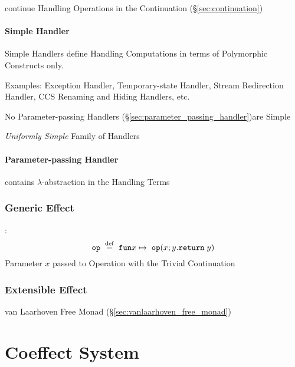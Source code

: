 continue Handling Operations in the Continuation
(\S\ref{sec:continuation})



\paragraph{Simple Handler}\label{sec:simple_handler}\hfill
\cite{plotkin-pretnar13}

Simple Handlers define Handling Computations in terms of Polymorphic
Constructs only.

Examples: Exception Handler, Temporary-state Handler, Stream
Redirection Handler, CCS Renaming and Hiding Handlers, etc.

No Parameter-passing Handlers
(\S\ref{sec:parameter_passing_handler})are Simple

\emph{Uniformly Simple} Family of Handlers



\paragraph{Parameter-passing Handler}\hfill
\label{sec:parameter_passing_handler}
\cite{plotkin-pretnar13}

contains $\lambda$-abstraction in the Handling Terms



\subsubsection{Generic Effect}\label{sec:generic_effect}

\cite{pretnar15}:
\[
  \mathtt{op}\; \stackrel{\mathrm{def}}{=} \;\mathtt{fun} x \mapsto
  \;\mathtt{op}(x; y.\mathtt{return}\; y)
\]
Parameter $x$ passed to Operation with the Trivial Continuation



\subsubsection{Extensible Effect}\label{sec:extensible_effect}

van Laarhoven Free Monad (\S\ref{sec:vanlaarhoven_free_monad})



\section{Coeffect System}\label{sec:coeffect_system}

